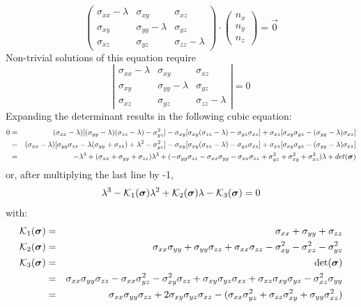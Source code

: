 \[
\left(\begin{array}{ccc}
\sigma_{xx}-\lambda & \sigma_{xy} & \sigma_{xz} \\
\sigma_{xy} & \sigma_{yy}-\lambda & \sigma_{yz} \\
\sigma_{xz} & \sigma_{yz} & \sigma_{zz} -\lambda
\end{array}\right)
\cdot
\left(\begin{array}{c}
n_x \\ n_y \\ n_z
\end{array}\right)
= \vec{0}
\]
Non-trivial solutions of this equation require 
\[
\left|  
\begin{array}{ccc}
\sigma_{xx}-\lambda & \sigma_{xy} & \sigma_{xz} \\
\sigma_{xy} & \sigma_{yy}-\lambda & \sigma_{yz} \\
\sigma_{xz} & \sigma_{yz} & \sigma_{zz} -\lambda
\end{array}
\right|
=0
\]
Expanding the determinant results in the following cubic equation:
\begin{eqnarray}
0 
&=&
(\sigma_{xx}-\lambda) [ ( \sigma_{yy}-\lambda )( \sigma_{zz} -\lambda)- \sigma_{yz}^2]
- \sigma_{xy} [ \sigma_{xy} ( \sigma_{zz} -\lambda) - \sigma_{yz} \sigma_{xz} ] 
+ \sigma_{xz} [ \sigma_{xy}  \sigma_{yz} - (\sigma_{yy}-\lambda )  \sigma_{xz} ]  \nonumber\\
&=& (\sigma_{xx}-\lambda) [ \sigma_{yy}\sigma_{zz} -\lambda (\sigma_{yy}+ \sigma_{zz})+ \lambda ^2- \sigma_{yz}^2]
- \sigma_{xy} [ \sigma_{xy} ( \sigma_{zz} -\lambda) - \sigma_{yz} \sigma_{xz} ] 
+ \sigma_{xz} [ \sigma_{xy}  \sigma_{yz} - (\sigma_{yy}-\lambda )  \sigma_{xz} ] \nonumber\\
&=& -\lambda^3
+ (\sigma_{xx} + \sigma_{yy} + \sigma_{zz} )\lambda^2
+ (-\sigma_{yy}\sigma_{zz} -\sigma_{xx}\sigma_{yy} -\sigma_{xx}\sigma_{zz} 
  +\sigma_{yz}^2 +\sigma_{xy}^2 + \sigma_{xz}^2 )\lambda
+ det({\bm \sigma}) \nonumber
\end{eqnarray}
or, after multiplying the last line by -1,
\begin{equation}
\lambda^3 - {\cal K}_1({\bm \sigma}) \lambda^2 + {\cal K}_2({\bm \sigma}) \lambda -{\cal K}_3({\bm \sigma})=0
\end{equation}
with:
\begin{eqnarray}
{\cal K}_1({\bm \sigma}) &=& \sigma_{xx}+\sigma_{yy}+\sigma_{zz}\nonumber\\
{\cal K}_2({\bm \sigma}) &=& \sigma_{xx}\sigma_{yy}+\sigma_{yy}\sigma_{zz}+\sigma_{xx}\sigma_{zz}
-\sigma_{xy}^2 -\sigma_{xz}^2 -\sigma_{yz}^2 \nonumber\\
{\cal K}_3({\bm \sigma}) 
&=& \det ({\bm \sigma}) \nonumber\\
&=& \sigma_{xx}\sigma_{yy}\sigma_{zz}-\sigma_{xx}\sigma_{yz}^2
-\sigma_{xy}^2\sigma_{zz}+\sigma_{xy}\sigma_{yz}\sigma_{xz}
+\sigma_{xz}\sigma_{xy}\sigma_{yz}-\sigma_{xz}^2\sigma_{yy} \nonumber\\
&=& \sigma_{xx}\sigma_{yy}\sigma_{zz}
+2\sigma_{xy}\sigma_{yz}\sigma_{xz}
-( \sigma_{xx}\sigma_{yz}^2 +  \sigma_{zz} \sigma_{xy}^2 + \sigma_{yy}\sigma_{xz}^2 )
\end{eqnarray}

